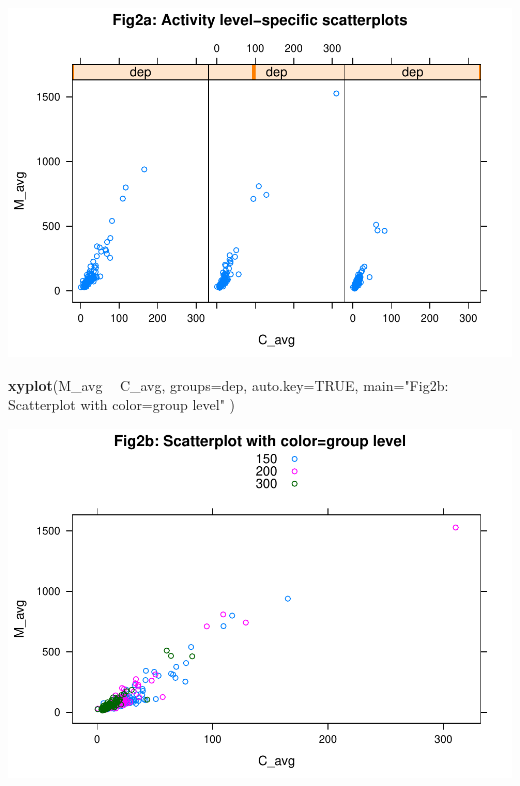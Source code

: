 \documentclass[]{article}
\newenvironment{Shaded}{\begin{snugshade}}{\end{snugshade}}
\newcommand{\DataTypeTok}[1]{\textcolor[rgb]{0.13,0.29,0.53}{#1}}
\newcommand{\KeywordTok}[1]{\textcolor[rgb]{0.13,0.29,0.53}{\textbf{#1}}}
\newcommand{\NormalTok}[1]{#1}
\newcommand{\OperatorTok}[1]{\textcolor[rgb]{0.81,0.36,0.00}{\textbf{#1}}}
\newcommand{\OtherTok}[1]{\textcolor[rgb]{0.56,0.35,0.01}{#1}}
\newcommand{\StringTok}[1]{\textcolor[rgb]{0.31,0.60,0.02}{#1}}
\begin{document}
\includegraphics{Term_Project_files/figure-latex/unnamed-chunk-2-2.pdf}

\begin{Shaded}
\begin{Highlighting}[]
    \KeywordTok{xyplot}\NormalTok{(M_avg }\OperatorTok{~}\StringTok{ }\NormalTok{C_avg, }\DataTypeTok{groups=}\NormalTok{dep, }
                  \DataTypeTok{auto.key=}\OtherTok{TRUE}\NormalTok{,}
                  \DataTypeTok{main=}\StringTok{"Fig2b: Scatterplot with color=group level"}
\NormalTok{           )}
\end{Highlighting}
\end{Shaded}

\includegraphics{Term_Project_files/figure-latex/unnamed-chunk-2-3.pdf}
\end{document}
